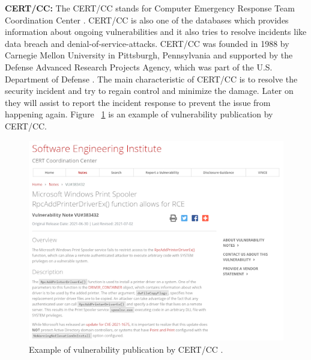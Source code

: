 {\bf CERT/CC:} The \acs{CERT/CC} stands for Computer Emergency Response Team Coordination Center \cite{Web2021}. \acs{CERT/CC} is also one of the databases which provides information about ongoing vulnerabilities and it also tries to resolve incidents like data breach and denial-of-service-attacks. \acs{CERT/CC} was founded in 1988 by Carnegie Mellon University in Pittsburgh, Pennsylvania and supported by the Defense Advanced Research Projects Agency, which was part of the U.S. Department of Defense \cite{CertDiv}. The main characteristic of \acs{CERT/CC} is to resolve the security incident and try to regain control and minimize the damage. Later on they will assist to report the incident response to prevent the issue from happening again. Figure ~\ref{fig:cert} is an example of vulnerability publication by \acs{CERT/CC}.
\newpage
\begin{figure}[h!]
	\includegraphics[width=15cm]{includes/cert-cc.png}
	\centering
	\caption{Example of vulnerability publication by \acs{CERT/CC} \cite{CertDiv}.}
	\label{fig:cert}
\end{figure}

